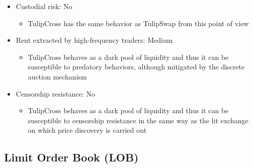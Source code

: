 \documentclass[11pt, reqno]{amsart}
\theoremstyle{definition}
\theoremstyle{remark}
\begin{document}
\begin{itemize}
\begin{itemize}
          \end{itemize}
    \item Custodial risk: No
          \begin{itemize}
              \item TulipCross has the same behavior as TulipSwap from this point of view
          \end{itemize}
    \item Rent extracted by high-frequency traders: Medium
          \begin{itemize}
              \item TulipCross behaves as a dark pool of liquidity and thus it can be susceptible
                    to predatory behaviors, although mitigated by the discrete auction mechanism
                    \cite{BuCrSh15}
          \end{itemize}
    \item Censorship resistance: No
          \begin{itemize}
              \item TulipCross behaves as a dark pool of liquidity and thus it can be susceptible
                    to censorship resistance in the same way as the lit exchange on which
                    price discovery is carried out
          \end{itemize}
\end{itemize}

\subsection{Limit Order Book (LOB)}
\end{document}
